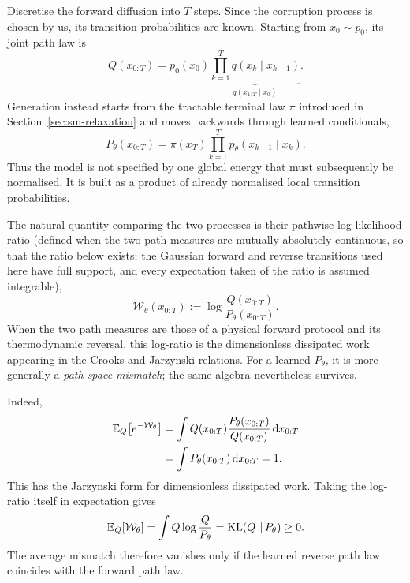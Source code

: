 Discretise the forward diffusion into $T$ steps. Since the corruption process
is chosen by us, its transition probabilities are known. Starting from
$x_0\sim p_0$, its joint path law is
\begin{equation}
  Q(x_{0:T})
  =
  p_0(x_0)
  \underbrace{
  \prod_{k=1}^{T}
  q(x_k\mid x_{k-1})
  }_{q(x_{1:T}\mid x_0)}.
  \label{eq:sm-forward-path}
\end{equation}
Generation instead starts from the tractable terminal law $\pi$ introduced in
Section~\ref{sec:sm-relaxation} and moves backwards through learned
conditionals,
\begin{equation}
  P_\theta(x_{0:T})
  =
  \pi(x_T)
  \prod_{k=1}^{T}
  p_\theta(x_{k-1}\mid x_k).
  \label{eq:sm-reverse-path}
\end{equation}
Thus the model is not specified by one global energy that must subsequently be
normalised. It is built as a product of already normalised local transition
probabilities.

The natural quantity comparing the two processes is their pathwise
log-likelihood ratio (defined when the two path measures are mutually
absolutely continuous, so that the ratio below exists; the Gaussian forward and
reverse transitions used here have full support, and every expectation taken of
the ratio is assumed integrable),
\begin{equation}
  \mathcal W_\theta(x_{0:T})
  :=
  \log
  \frac{Q(x_{0:T})}{P_\theta(x_{0:T})}.
  \label{eq:sm-work}
\end{equation}
When the two path measures are those of a physical forward protocol and its
thermodynamic reversal, this log-ratio is the dimensionless dissipated work
appearing in the Crooks and Jarzynski relations. For a learned
$P_\theta$, it is more generally a \emph{path-space mismatch}; the same
algebra nevertheless survives.

Indeed,
\begin{align}
  \mathbb{E}_Q\!\left[e^{-\mathcal W_\theta}\right]
  &=
  \int
  Q(x_{0:T})
  \frac{P_\theta(x_{0:T})}{Q(x_{0:T})}
  \,\mathrm{d} x_{0:T}
  \nonumber\\
  &=
  \int
  P_\theta(x_{0:T})
  \,\mathrm{d} x_{0:T}
  =1.
  \label{eq:sm-jarzynski}
\end{align}
This has the Jarzynski form for dimensionless dissipated work. Taking the
log-ratio itself in expectation gives
\begin{equation}
  \mathbb{E}_Q[\mathcal W_\theta]
  =
  \int Q
  \log\frac{Q}{P_\theta}
  =
  \operatorname{KL}(Q\,\|\,P_\theta)
  \geq 0.
  \label{eq:sm-secondlaw}
\end{equation}
The average mismatch therefore vanishes only if the learned reverse path law
coincides with the forward path law.

